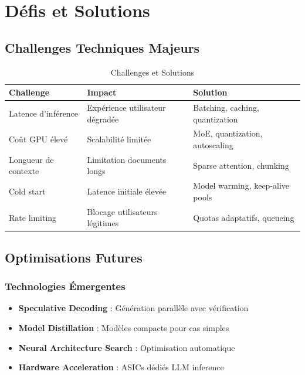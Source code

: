 \documentclass[12pt,a4paper]{article}
\begin{document}
\newpage
\section{Défis et Solutions}

\subsection{Challenges Techniques Majeurs}

\begin{table}[h]
\centering
\small
\begin{tabular}{|p{4cm}|p{5cm}|p{5cm}|}
\hline
\textbf{Challenge} & \textbf{Impact} & \textbf{Solution} \\
\hline
Latence d'inférence & Expérience utilisateur dégradée & Batching, caching, quantization \\
\hline
Coût GPU élevé & Scalabilité limitée & MoE, quantization, autoscaling \\
\hline
Longueur de contexte & Limitation documents longs & Sparse attention, chunking \\
\hline
Cold start & Latence initiale élevée & Model warming, keep-alive pools \\
\hline
Rate limiting & Blocage utilisateurs légitimes & Quotas adaptatifs, queueing \\
\hline
\end{tabular}
\caption{Challenges et Solutions}
\end{table}

\subsection{Optimisations Futures}

\subsubsection{Technologies Émergentes}
\begin{itemize}[noitemsep]
    \item \textbf{Speculative Decoding} : Génération parallèle avec vérification
    \item \textbf{Model Distillation} : Modèles compacts pour cas simples
    \item \textbf{Neural Architecture Search} : Optimisation automatique
    \item \textbf{Hardware Acceleration} : ASICs dédiés LLM inference
\end{itemize}
\end{document}
